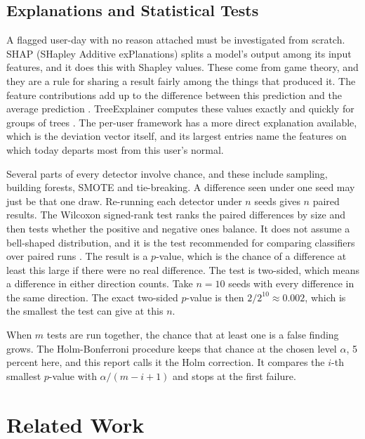 \documentclass[a4paper,12pt]{article}
\begin{document}
\subsection{Explanations and Statistical Tests}
A flagged user-day with no reason attached must be investigated from scratch. SHAP (SHapley Additive exPlanations) splits a model's output among its input features, and it does this with Shapley values. These come from game theory, and they are a rule for sharing a result fairly among the things that produced it. The feature contributions add up to the difference between this prediction and the average prediction \cite{Lundberg2017}. TreeExplainer computes these values exactly and quickly for groups of trees \cite{Lundberg2020}. The per-user framework has a more direct explanation available, which is the deviation vector itself, and its largest entries name the features on which today departs most from this user's normal.

Several parts of every detector involve chance, and these include sampling, building forests, SMOTE and tie-breaking. A difference seen under one seed may just be that one draw. Re-running each detector under $n$ seeds gives $n$ paired results. The Wilcoxon signed-rank test \cite{Wilcoxon1945} ranks the paired differences by size and then tests whether the positive and negative ones balance. It does not assume a bell-shaped distribution, and it is the test recommended for comparing classifiers over paired runs \cite{Demsar2006}. The result is a $p$-value, which is the chance of a difference at least this large if there were no real difference. The test is two-sided, which means a difference in either direction counts. Take $n=10$ seeds with every difference in the same direction. The exact two-sided $p$-value is then $2/2^{10} \approx 0.002$, which is the smallest the test can give at this $n$.

When $m$ tests are run together, the chance that at least one is a false finding grows. The Holm-Bonferroni procedure \cite{Holm1979} keeps that chance at the chosen level $\alpha$, 5 percent here, and this report calls it the Holm correction. It compares the $i$-th smallest $p$-value with $\alpha/(m-i+1)$ and stops at the first failure.

\section{Related Work}
\label{sec:related}
\end{document}
